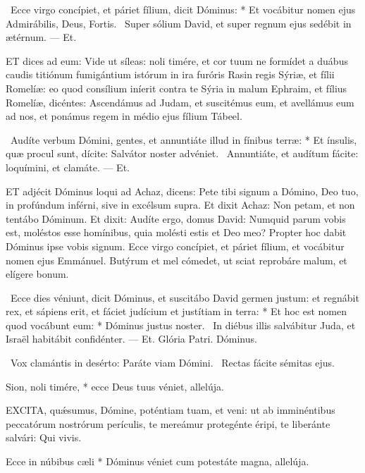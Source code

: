 \R\ Ecce virgo concípiet, et páriet fílium, dicit Dóminus: * Et vocábitur nomen ejus Admirábilis, Deus, Fortis. \V\ Super sólium David, et super regnum ejus sedébit in ætérnum. --- Et.


\lettrine[lines=2]{E}{T} dices ad eum: Vide ut síleas: noli timére, et cor tuum ne formídet a duábus caudis titiónum fumigántium istórum in ira furóris Rasin regis Sýriæ, et fílii Romelíæ: eo quod consílium iníerit contra te Sýria in malum Ephraim, et fílius Romelíæ, dicéntes: Ascendámus ad Judam, et suscitémus eum, et avellámus eum ad nos, et ponámus regem in médio ejus fílium Tábeel.

\R\ Audíte verbum Dómini, gentes, et annuntiáte illud in fínibus terræ: * Et ínsulis, quæ procul sunt, dícite: Salvátor noster advéniet. \V\ Annuntiáte, et audítum fácite: loquímini, et clamáte. --- Et.


\lettrine[lines=2]{E}{T} adjécit Dóminus loqui ad Achaz, dicens: Pete tibi signum a Dómino, Deo tuo, in profúndum inférni, sive in excélsum supra. Et dixit Achaz: Non petam, et non tentábo Dóminum. Et dixit: Audíte ergo, domus David: Numquid parum vobis est, moléstos esse homínibus, quia molésti estis et Deo meo? Propter hoc dabit Dóminus ipse vobis signum. Ecce virgo concípiet, et páriet fílium, et vocábitur nomen ejus Emmánuel. Butýrum et mel cómedet, ut sciat reprobáre malum, et elígere bonum.

\R\ Ecce dies véniunt, dicit Dóminus, et suscitábo David germen justum: et regnábit rex, et sápiens erit, et fáciet judícium et justítiam in terra: * Et hoc est nomen quod vocábunt eum: * Dóminus justus noster. \V\ In diébus illis salvábitur Juda, et Israël habitábit confidénter. --- Et. Glória Patri. Dóminus.

\V\ Vox clamántis in desérto: Paráte viam Dómini. \R\ Rectas fácite sémitas ejus.

 Sion, noli timére, * ecce Deus tuus véniet, allelúja.


\lettrine[lines=2]{E}{XCITA}, quǽsumus, Dómine, poténtiam tuam, et veni: ut ab imminéntibus peccatórum nostrórum perículis, te mereámur protegénte éripi, te liberánte salvári: Qui vivis.


 Ecce in núbibus cæli * Dóminus véniet cum potestáte magna, allelúja.

